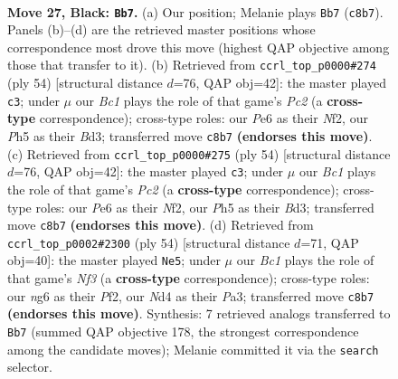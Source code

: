 \documentclass[11pt]{article}
\begin{document}
\clearpage

\begin{figure}[p]\centering
\begin{subfigure}{0.46\textwidth}\centering
\resizebox{\linewidth}{!}{%
\newchessgame
\chessboard[
  setfen={r1bk4/8/2p1p1N1/P1b1P2p/3n1P1P/1p6/3B3K/RN6 b - - 0 27},
  showmover=false,
  pgfstyle=straightmove, color=movearrow, markmove={c8-b7}
]}
\caption{}
\end{subfigure}\hfill
\begin{subfigure}{0.46\textwidth}\centering
\resizebox{\linewidth}{!}{%
\newchessgame
\chessboard[
  setfen={r6k/3bn1p1/4p2b/3p4/p6P/3B2P1/R1P2N2/4R1K1 w - - 0 28},
  showmover=false,
  pgfstyle=straightmove, color=movearrow, markmove={c2-c3}
]}
\caption{}
\end{subfigure}
\\[4pt]
\begin{subfigure}{0.46\textwidth}\centering
\resizebox{\linewidth}{!}{%
\newchessgame
\chessboard[
  setfen={r6k/3bn1p1/4p2b/3p4/p6P/3B2P1/R1P2N2/4R1K1 w - - 0 28},
  showmover=false,
  pgfstyle=straightmove, color=movearrow, markmove={c2-c3}
]}
\caption{}
\end{subfigure}\hfill
\begin{subfigure}{0.46\textwidth}\centering
\resizebox{\linewidth}{!}{%
\newchessgame
\chessboard[
  setfen={3r2k1/pp3pp1/3n2bp/1P1B4/3R2P1/P4N1P/5P2/6K1 w - - 1 28},
  showmover=false,
  pgfstyle=straightmove, color=movearrow, markmove={f3-e5}
]}
\caption{}
\end{subfigure}
\caption{\textbf{Move 27, Black: \texttt{Bb7}.} (a) Our position; Melanie plays \texttt{Bb7} (\texttt{c8b7}). Panels (b)--(d) are the retrieved master positions whose correspondence most drove this move (highest QAP objective among those that transfer to it). (b) Retrieved from \texttt{ccrl\_top\_p0000\#274} (ply 54) [structural distance $d$=76, QAP obj=42]: the master played \texttt{c3}; under $\mu$ our \emph{Bc1} plays the role of that game's \emph{Pc2} (a \textbf{cross-type} correspondence); cross-type roles: our \emph{P}e6 as their \emph{N}f2, our \emph{P}h5 as their \emph{B}d3; transferred move \texttt{c8b7} \textbf{(endorses this move)}. (c) Retrieved from \texttt{ccrl\_top\_p0000\#275} (ply 54) [structural distance $d$=76, QAP obj=42]: the master played \texttt{c3}; under $\mu$ our \emph{Bc1} plays the role of that game's \emph{Pc2} (a \textbf{cross-type} correspondence); cross-type roles: our \emph{P}e6 as their \emph{N}f2, our \emph{P}h5 as their \emph{B}d3; transferred move \texttt{c8b7} \textbf{(endorses this move)}. (d) Retrieved from \texttt{ccrl\_top\_p0002\#2300} (ply 54) [structural distance $d$=71, QAP obj=40]: the master played \texttt{Ne5}; under $\mu$ our \emph{Bc1} plays the role of that game's \emph{Nf3} (a \textbf{cross-type} correspondence); cross-type roles: our \emph{n}g6 as their \emph{P}f2, our \emph{N}d4 as their \emph{P}a3; transferred move \texttt{c8b7} \textbf{(endorses this move)}. Synthesis: 7 retrieved analogs transferred to \texttt{Bb7} (summed QAP objective 178, the strongest correspondence among the candidate moves); Melanie committed it via the \texttt{search} selector.}
\label{fig:thought-m53}
\end{figure}
\end{document}
